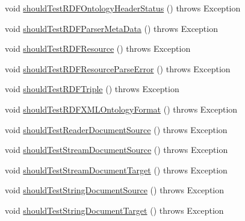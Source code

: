 \begin{DoxyCompactItemize}
\item 
void \hyperlink{classorg_1_1semanticweb_1_1owlapi_1_1contract_1_1_contract_owlapi_io_test_ab287f633e62614b1b05494def0feb260}{should\-Test\-R\-D\-F\-Ontology\-Header\-Status} ()  throws Exception 
\item 
void \hyperlink{classorg_1_1semanticweb_1_1owlapi_1_1contract_1_1_contract_owlapi_io_test_a701a44674824d6df7cd3adf26ec243d9}{should\-Test\-R\-D\-F\-Parser\-Meta\-Data} ()  throws Exception 
\item 
void \hyperlink{classorg_1_1semanticweb_1_1owlapi_1_1contract_1_1_contract_owlapi_io_test_a3bf831fd5ec95fe681ecc736e9f422e5}{should\-Test\-R\-D\-F\-Resource} ()  throws Exception 
\item 
void \hyperlink{classorg_1_1semanticweb_1_1owlapi_1_1contract_1_1_contract_owlapi_io_test_ab7fd477df83b1244534baa125f2d1517}{should\-Test\-R\-D\-F\-Resource\-Parse\-Error} ()  throws Exception 
\item 
void \hyperlink{classorg_1_1semanticweb_1_1owlapi_1_1contract_1_1_contract_owlapi_io_test_a178d636616630152d2168d634430dac1}{should\-Test\-R\-D\-F\-Triple} ()  throws Exception 
\item 
void \hyperlink{classorg_1_1semanticweb_1_1owlapi_1_1contract_1_1_contract_owlapi_io_test_ac0403be7868ff5bf77a4fae0fbc91e15}{should\-Test\-R\-D\-F\-X\-M\-L\-Ontology\-Format} ()  throws Exception 
\item 
void \hyperlink{classorg_1_1semanticweb_1_1owlapi_1_1contract_1_1_contract_owlapi_io_test_a3065cf331bc8aac018ec201ac2d7cda2}{should\-Test\-Reader\-Document\-Source} ()  throws Exception 
\item 
void \hyperlink{classorg_1_1semanticweb_1_1owlapi_1_1contract_1_1_contract_owlapi_io_test_a5e629a3cba866a7aa605b2da11e6bf99}{should\-Test\-Stream\-Document\-Source} ()  throws Exception 
\item 
void \hyperlink{classorg_1_1semanticweb_1_1owlapi_1_1contract_1_1_contract_owlapi_io_test_a6197b04cfd674978ffe3a84f79073bda}{should\-Test\-Stream\-Document\-Target} ()  throws Exception 
\item 
void \hyperlink{classorg_1_1semanticweb_1_1owlapi_1_1contract_1_1_contract_owlapi_io_test_aea60974b189bb60c0cbea2983dac08b3}{should\-Test\-String\-Document\-Source} ()  throws Exception 
\item 
void \hyperlink{classorg_1_1semanticweb_1_1owlapi_1_1contract_1_1_contract_owlapi_io_test_a210fb50f4ed3245bff74ac5c170f79c7}{should\-Test\-String\-Document\-Target} ()  throws Exception 
\item 

\end{DoxyCompactItemize}

